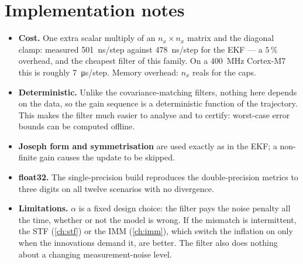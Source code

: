 \section{Implementation notes}
\begin{itemize}[leftmargin=1.4em]
\item \textbf{Cost.}  One extra scalar multiply of an $n_x\times n_x$ matrix and the diagonal clamp:
      measured \SI{501}{\nano\second}/step against \SI{478}{\nano\second}/step for the EKF ---
      a $5\,\%$ overhead, and the cheapest filter of this family.  On a \SI{400}{\mega\hertz}
      Cortex-M7 this is roughly \SI{7}{\micro\second}/step.  Memory overhead: $n_x$ reals for the caps.
\item \textbf{Deterministic.}  Unlike the covariance-matching filters, nothing here depends on the
      data, so the gain sequence is a deterministic function of the trajectory.  This makes the
      filter much easier to analyse and to certify: worst-case error bounds can be computed offline.
\item \textbf{Joseph form and symmetrisation} are used exactly as in the EKF; a non-finite gain
      causes the update to be skipped.
\item \textbf{float32.}  The single-precision build reproduces the double-precision metrics to three
      digits on all twelve scenarios with no divergence.
\item \textbf{Limitations.}  $\alpha$ is a fixed design choice: the filter pays the noise penalty all
      the time, whether or not the model is wrong.  If the mismatch is intermittent, the STF
      (\cref{ch:stf}) or the IMM (\cref{ch:imm}), which switch the inflation on only when the
      innovations demand it, are better.  The filter also does nothing about a changing
      measurement-noise level.
\end{itemize}

